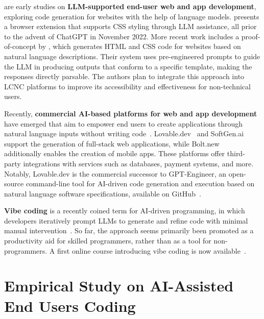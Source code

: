\documentclass[english,anonymous]{lni}
\begin{document}
\cite{huangCreatingUserInterface2021, jiangGenLineGenFormTwo2021} are early studies on \textbf{LLM-supported end-user web and app development}, exploring code generation for websites with the help of language models. \cite{kimStyletteStylingWeb2022} presents a browser extension that supports CSS styling through LLM assistance, all prior to the advent of ChatGPT in November 2022.
More recent work includes a proof-of-concept by \cite{caloLeveragingLargeLanguage2023}, which generates HTML and CSS code for websites based on natural language descriptions. Their system uses pre-engineered prompts to guide the LLM in producing outputs that conform to a specific template, making the responses directly parsable. The authors plan to integrate this approach into LCNC platforms to improve its accessibility and effectiveness for non-technical users.


Recently, \textbf{commercial AI-based platforms for web and app development} have emerged that aim to empower end users to create applications through natural language inputs without writing code~\cite{kortixaiSoftgenAIWeb2024, lovablelabsincorporatedLovable2025, stackblitzBoltnew2025}. Lovable.dev~\cite{lovablelabsincorporatedLovable2025} and SoftGen.ai~\cite{kortixaiSoftgenAIWeb2024} support the generation of full-stack web applications, while Bolt.new~\cite{stackblitzBoltnew2025} additionally enables the creation of mobile apps. These platforms offer third-party integrations with services such as databases, payment systems, and more. Notably, Lovable.dev is the commercial successor to GPT-Engineer, an open-source command-line tool for AI-driven code generation and execution based on natural language software specifications, available on GitHub~\cite{osikaGptengineer2023}.



\textbf{Vibe coding} is a recently coined term for AI-driven programming, in which developers iteratively prompt LLMs to generate and refine code with minimal manual intervention~\cite{karpathyTheresNewKind2025}. So far, the approach seems  primarily been promoted as a productivity aid for skilled programmers, rather than as a tool for non-programmers. A first online course introducing vibe coding is  now available~\cite{deeplearning.aiVibeCoding1012025}.


\section{Empirical Study on AI-Assisted End Users Coding}
\end{document}
